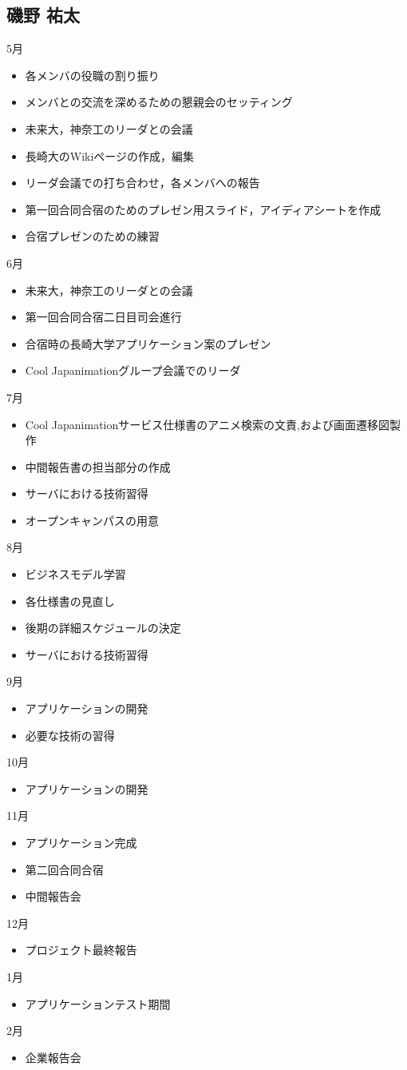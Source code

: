 \subsection{磯野 祐太}
5月
\begin{itemize}
\item 各メンバの役職の割り振り 
\item メンバとの交流を深めるための懇親会のセッティング 
\item 未来大，神奈工のリーダとの会議 
\item 長崎大のWikiページの作成，編集 
\item リーダ会議での打ち合わせ，各メンバへの報告 
\item 第一回合同合宿のためのプレゼン用スライド，アイディアシートを作成 
\item 合宿プレゼンのための練習 
\end{itemize}
6月
\begin{itemize}
\item 未来大，神奈工のリーダとの会議 
\item 第一回合同合宿二日目司会進行 
\item 合宿時の長崎大学アプリケーション案のプレゼン 
\item Cool Japanimationグループ会議でのリーダ 
\end{itemize}
7月
\begin{itemize}
\item Cool Japanimationサービス仕様書のアニメ検索の文責,および画面遷移図製作 
\item 中間報告書の担当部分の作成 
\item サーバにおける技術習得 
\item オープンキャンパスの用意 
\end{itemize}
8月
\begin{itemize}
\item ビジネスモデル学習 
\item 各仕様書の見直し 
\item 後期の詳細スケジュールの決定 
\item サーバにおける技術習得 
\end{itemize}
9月
\begin{itemize}
\item アプリケーションの開発 
\item 必要な技術の習得 
\end{itemize}
10月
\begin{itemize} 
\item アプリケーションの開発 
\end{itemize}
11月
\begin{itemize}
\item アプリケーション完成 
\item 第二回合同合宿 
\item 中間報告会
\end{itemize}
12月
\begin{itemize}
\item プロジェクト最終報告
\end{itemize}
1月
\begin{itemize}
\item アプリケーションテスト期間
\end{itemize}
2月
\begin{itemize}
\item 企業報告会
\end{itemize}
